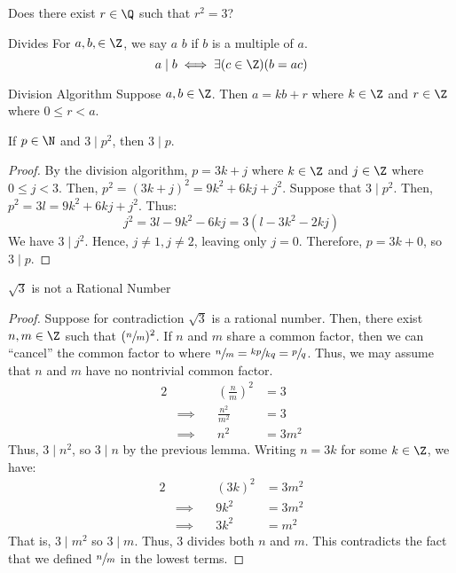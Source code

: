 Does there exist $r \in \Q$ such that $r^2 = 3$?

\begin{dfnbox}{Divides}{}
    For $a,b, \in \Z$, we say $a$  $b$ if $b$ is a multiple of $a$.
    \tcblower
    \[ a \mid b \iff \exists(c \in \Z)(b=ac) \]
\end{dfnbox}

\begin{thmbox}{Division Algorithm}{}
    Suppose $a,b \in \Z$. Then $a = kb + r$ where $k \in \Z$ and $r \in \Z$ where $0 \leq r < a$.
\end{thmbox}

\begin{exbox}{}{}
    If $p \in \N$ and $3 \mid p^2$, then $3 \mid p$.
    \tcblower
    \begin{proof}
        By the division algorithm, $p = 3k+j$ where $k \in \Z$ and $j \in \Z$ where $0 \leq j < 3$. Then, $p^2 = (3k+j)^2 = 9k^2 + 6kj + j^2$. Suppose that $3 \mid p^2$. Then, $p^2 = 3l = 9k^2 + 6kj + j^2$. Thus:
        \[ j^2 = 3l-9k^2-6kj = 3(l-3k^2-2kj) \]
        We have $3 \mid j^2$. Hence, $j \neq 1, j \neq 2$, leaving only $j = 0$. Therefore, $p = 3k + 0$, so $3 \mid p$.
    \end{proof}
\end{exbox}

\begin{exbox}{$\sqrt{3}$ is not a Rational Number}{}
    \begin{proof}
        Suppose for contradiction $\sqrt{3}$ is a rational number. Then, there exist $n, m \in \Z$ such that $(\sfrac{n}{m})^2$. If $n$ and $m$ share a common factor, then we can ``cancel'' the common factor to where $\sfrac{n}{m} = \sfrac{kp}{kq} = \sfrac{p}{q}$. Thus, we may assume that $n$ and $m$ have no nontrivial common factor.
        \begin{alignat*}{2}
            && \left(\frac{n}{m}\right)^2 &= 3 \\
            & \implies \quad & \frac{n^2}{m^2} &= 3 \\
            & \implies \quad & n^2 &= 3m^2
        \end{alignat*}
        Thus, $3 \mid n^2$, so $3 \mid n$ by the previous lemma. Writing $n = 3k$ for some $k \in \Z$, we have:
        \begin{alignat*}{2}
            && (3k)^2 &= 3m^2 \\
            & \implies \quad & 9k^2 &= 3m^2 \\
            & \implies \quad & 3k^2 &= m^2
        \end{alignat*}
        That is, $3 \mid m^2$ so $3 \mid m$. Thus, $3$ divides both $n$ and $m$. This contradicts the fact that we defined $\sfrac{n}{m}$ in the lowest terms.
    \end{proof}
\end{exbox}

